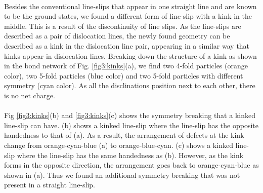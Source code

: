 \documentclass[12pt]{article}
\begin{document}
\paragraph{}
Besides the conventional line-slips that appear in one straight line and are known to be the ground states, we found a different form of line-slip with a kink in the middle. This is a result of the discontinuity of line slips. As the line-slips are described as a pair of dislocation lines, the newly found geometry can be described as a kink in the dislocation line pair, appearing in a similar way that kinks appear in dislocation lines. Breaking down the structure of a kink as shown in the bond network of Fig. \ref{fig3:kinks}(a), we find two 4-fold particles (orange color), two 5-fold particles (blue color) and two 5-fold particles with different symmetry (cyan color). As all the disclinations position next to each other, there is no net charge.

\paragraph{}
Fig \ref{fig3:kinks}(b) and \ref{fig3:kinks}(c) shows the symmetry breaking that a kinked line-slip can have. (b) shows a kinked line-slip where the line-slip has the opposite handedness to that of (a). As a result, the arrangement of defects at the kink change from orange-cyan-blue (a) to orange-blue-cyan. (c) shows a kinked line-slip where the line-slip has the same handedness as (b). However, as the kink forms in the opposite direction, the arrangement goes back to orange-cyan-blue as shown in (a). Thus we found an additional symmetry breaking that was not present in a straight line-slip. 
\end{document}
